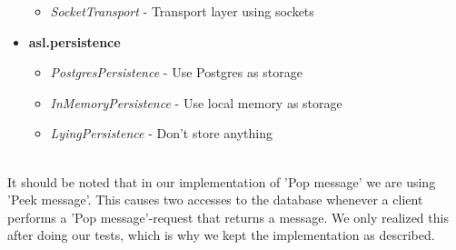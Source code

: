 \documentclass{article}
\begin{document}
\begin{itemize}
\begin{itemize}
                    \item \textit{SocketTransport} - Transport layer using sockets
                \end{itemize}
                \item \textbf{asl.persistence}
                \begin{itemize}
                    \item \textit{PostgresPersistence} - Use Postgres as storage
                    \item \textit{InMemoryPersistence} - Use local memory as storage
                    \item \textit{LyingPersistence} - Don't store anything
                \end{itemize}
            \end{itemize}
            ~\\
            It should be noted that in our implementation of 'Pop message' we are using 'Peek message'. This causes two accesses to the database whenever a client performs a 'Pop message'-request that returns a message. We only realized this after doing our tests, which is why we kept the implementation as described.
\end{document}
